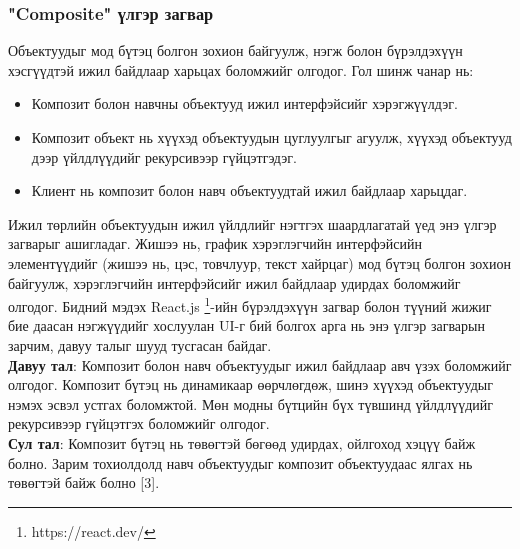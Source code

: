 \subsubsection{"Composite" үлгэр загвар}
\quad \quad Объектуудыг мод бүтэц болгон зохион байгуулж,	 нэгж болон бүрэлдэхүүн хэсгүүдтэй ижил байдлаар харьцах боломжийг олгодог. Гол шинж чанар нь:
\begin{itemize}
	\item Композит болон навчны объектууд ижил интерфэйсийг хэрэгжүүлдэг.
	\item Композит объект нь хүүхэд объектуудын цуглуулгыг агуулж, хүүхэд объектууд дээр үйлдлүүдийг рекурсивээр гүйцэтгэдэг.
	\item Клиент нь композит болон навч объектуудтай ижил байдлаар харьцдаг.
\end{itemize}
Ижил төрлийн объектуудын ижил үйлдлийг нэгтгэх шаардлагатай үед энэ үлгэр загварыг ашигладаг. Жишээ нь, график хэрэглэгчийн интерфэйсийн элементүүдийг (жишээ нь, цэс, товчлуур, текст хайрцаг) мод бүтэц болгон зохион байгуулж, хэрэглэгчийн интерфэйсийг ижил байдлаар удирдах боломжийг олгодог. Бидний мэдэх React.js \footnote{https://react.dev/}-ийн бүрэлдэхүүн загвар болон түүний жижиг бие даасан нэгжүүдийг хослуулан UI-г бий болгох арга нь энэ үлгэр загварын зарчим, давуу талыг шууд тусгасан байдаг.\\	
\textbf{Давуу тал}: Композит болон навч объектуудыг ижил байдлаар авч үзэх боломжийг олгодог. Композит бүтэц нь динамикаар өөрчлөгдөж, шинэ хүүхэд объектуудыг нэмэх эсвэл устгах боломжтой. Мөн модны бүтцийн бүх түвшинд үйлдлүүдийг рекурсивээр гүйцэтгэх боломжийг олгодог.\\
\textbf{Сул тал}: Композит бүтэц нь төвөгтэй бөгөөд удирдах, ойлгоход хэцүү байж болно. Зарим тохиолдолд навч объектуудыг композит объектуудаас ялгах нь төвөгтэй байж болно [3].

